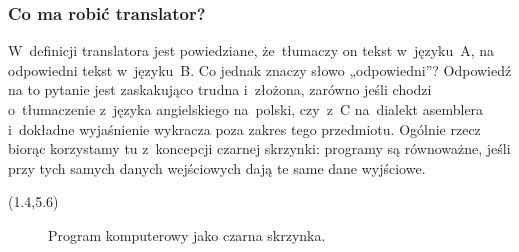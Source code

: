 \documentclass[10pt,t]{beamer}
\begin{document}
\begin{frame}
  \frametitle{Co ma robić translator?}


  W~definicji translatora jest powiedziane, że~tłumaczy on tekst
  w~języku~A, na \alert{odpowiedni} tekst w~języku~B. Co jednak znaczy
  słowo „odpowiedni”? Odpowiedź na to pytanie jest zaskakująco trudna
  i~złożona, zarówno jeśli chodzi o~tłumaczenie z~języka angielskiego
  na~polski, czy~z~C na~dialekt asemblera i~dokładne wyjaśnienie wykracza
  poza zakres tego przedmiotu. Ogólnie rzecz biorąc korzystamy tu
  z~koncepcji czarnej skrzynki: programy są równoważne, jeśli przy tych
  samych danych wejściowych dają te same dane wyjściowe.





  \begin{textblock}{10.1}(1.4,5.6)

    \begin{figure}

      \label{fig:Program-as-black-box-01}



      \caption{Program komputerowy jako czarna skrzynka.}


    \end{figure}

  \end{textblock}

\end{frame}
\end{document}
